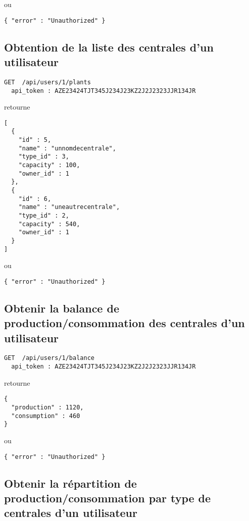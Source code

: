 ou 

\begin{lstlisting}
{ "error" : "Unauthorized" }
\end{lstlisting}

\subsection{Obtention de la liste des centrales d'un utilisateur}

\begin{lstlisting}
GET  /api/users/1/plants
  api_token : AZE23424TJT345J234J23KZ2J2J2323JJR134JR
\end{lstlisting}

retourne

\begin{lstlisting}
[ 
  { 
    "id" : 5,
    "name" : "unnomdecentrale",
    "type_id" : 3,
    "capacity" : 100,
    "owner_id" : 1
  },
  { 
    "id" : 6,
    "name" : "uneautrecentrale",
    "type_id" : 2,
    "capacity" : 540,
    "owner_id" : 1
  }
]
\end{lstlisting}
 
ou 

\begin{lstlisting}
{ "error" : "Unauthorized" }
\end{lstlisting}

\subsection{Obtenir la balance de production/consommation des centrales d'un utilisateur}

\begin{lstlisting}
GET  /api/users/1/balance
  api_token : AZE23424TJT345J234J23KZ2J2J2323JJR134JR
\end{lstlisting}

retourne

\begin{lstlisting}
{ 
  "production" : 1120,
  "consumption" : 460
}
\end{lstlisting}
 
ou 

\begin{lstlisting}
{ "error" : "Unauthorized" }
\end{lstlisting}

\subsection{Obtenir la répartition de production/consommation par type de centrales d'un utilisateur}

